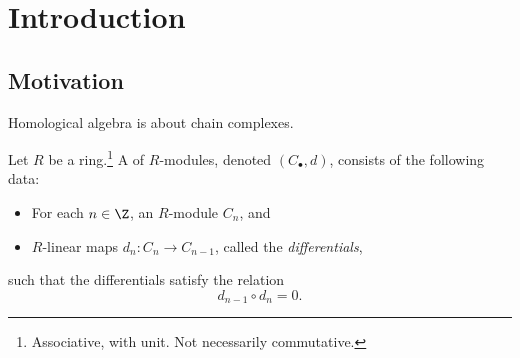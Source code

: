 \documentclass[main.tex]{subfiles}
\begin{document}
\chapter{Introduction}
\label{ch:introduction}

\section{Motivation}
\label{sec:motivation}

Homological algebra is about chain complexes.
\begin{definition}
  \label{def:chain_complex}
  Let $R$ be a ring.\footnote{Associative, with unit. Not necessarily commutative.} A  of $R$-modules, denoted $(C_{\bullet}, d)$, consists of the following data:
  \begin{itemize}
    \item For each $n \in \Z$, an $R$-module $C_{n}$, and

    \item $R$-linear maps $d_{n}\colon C_{n} \to C_{n-1}$, called the \emph{differentials},
  \end{itemize}
  such that the differentials satisfy the relation
  \begin{equation*}
    d_{n-1} \circ d_{n} = 0.
  \end{equation*}
\end{definition}
\end{document}
